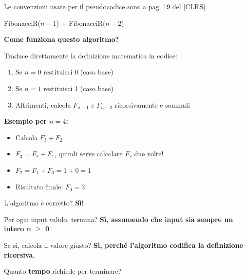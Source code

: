 \begin{nota}
	Le convenzioni usate per il pseudocodice sono a pag. 19 del [CLRS].
\end{nota}

\begin{algorithm}[H]
	\caption{FibonacciR}
	\Return FibonacciR($n-1$) + FibonacciR($n-2$)\;
\end{algorithm}

\begin{softnote}
	\textbf{Come funziona questo algoritmo?}
	
	Traduce direttamente la definizione matematica in codice:
	\begin{enumerate}
		\item Se $n=0$ restituisci 0 (caso base)
		\item Se $n=1$ restituisci 1 (caso base)
		\item Altrimenti, calcola $F_{n-1}$ e $F_{n-2}$ ricorsivamente e sommali
	\end{enumerate}
	
	\textbf{Esempio per $n=4$:}
	\begin{itemize}
		\item Calcola $F_3 + F_2$
		\item $F_3 = F_2 + F_1$, quindi serve calcolare $F_2$ due volte!
		\item $F_2 = F_1 + F_0 = 1 + 0 = 1$
		\item Risultato finale: $F_4 = 3$
	\end{itemize}
\end{softnote}

L'algoritmo è corretto? \textbf{Sì!}

Per ogni input valido, termina? \textbf{Sì, assumendo che input sia sempre un intero n  $\geq$ 0}

Se sì, calcola il valore giusto? \textbf{Sì, perché l'algoritmo codifica la definizione ricorsiva.}

Quanto \textbf{tempo} richiede per terminare?

